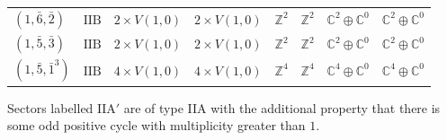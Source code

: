 \documentclass[11pt,a4paper]{article}
\begin{document}
\begin{appendix}
\begin{table}
\begin{tabular}{C{2.65cm}C{0.85cm}C{3.0cm}C{3.0cm}C{2.25cm}C{2.25cm}C{1.55cm}C{1.55cm}}
\((1, \bar{6}, \bar{2})\) & \(\mathrm{IIB}\) & \(2 \times V(1,0)\) & \(2 \times V(1,0)\) & \(\mathbb{Z}^{2}\) & \(\mathbb{Z}^{2}\) & \(\mathbb{C}^{2} \oplus \mathbb{C}^{0}\) & \(\mathbb{C}^{2} \oplus \mathbb{C}^{0}\) \\
\((1, \bar{5}, \bar{3})\) & \(\mathrm{IIB}\) & \(2 \times V(1,0)\) & \(2 \times V(1,0)\) & \(\mathbb{Z}^{2}\) & \(\mathbb{Z}^{2}\) & \(\mathbb{C}^{2} \oplus \mathbb{C}^{0}\) & \(\mathbb{C}^{2} \oplus \mathbb{C}^{0}\) \\
\((1, \bar{5}, \bar{1}^{3})\) & \(\mathrm{IIB}\) & \(4 \times V(1,0)\) & \(4 \times V(1,0)\) & \(\mathbb{Z}^{4}\) & \(\mathbb{Z}^{4}\) & \(\mathbb{C}^{4} \oplus \mathbb{C}^{0}\) & \(\mathbb{C}^{4} \oplus \mathbb{C}^{0}\) \\
\bottomrule
\end{tabular}
\smallskip

\begin{minipage}{0.8\textwidth}
{\strut Sectors labelled $\mathrm{IIA}'$ are of type IIA with the additional property that there is some odd positive cycle with multiplicity greater than $1$.}
\end{minipage}
\end{table}




\end{appendix}
\end{document}
